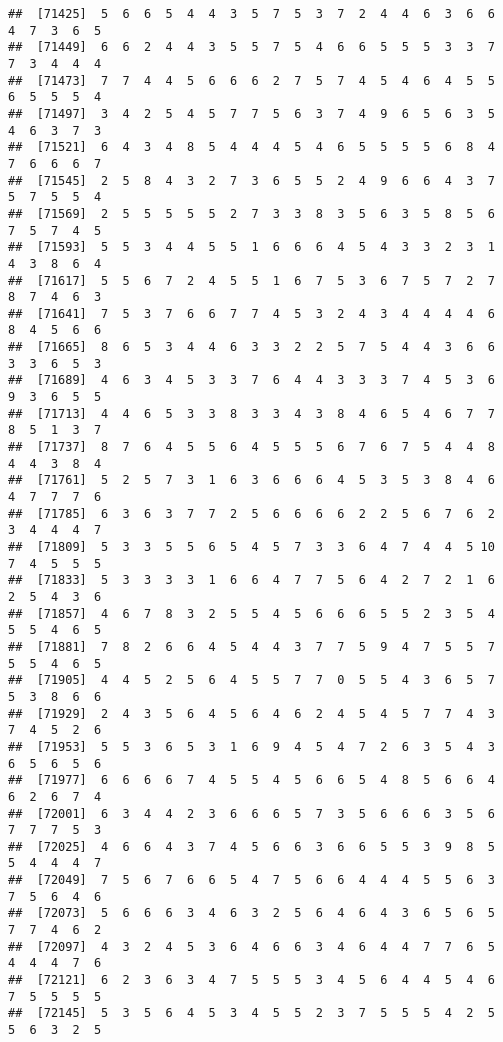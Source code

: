 \documentclass[
]{book}
\begin{document}
\begin{verbatim}
##  [71425]  5  6  6  5  4  4  3  5  7  5  3  7  2  4  4  6  3  6  6  4  7  3  6  5
##  [71449]  6  6  2  4  4  3  5  5  7  5  4  6  6  5  5  5  3  3  7  7  3  4  4  4
##  [71473]  7  7  4  4  5  6  6  6  2  7  5  7  4  5  4  6  4  5  5  6  5  5  5  4
##  [71497]  3  4  2  5  4  5  7  7  5  6  3  7  4  9  6  5  6  3  5  4  6  3  7  3
##  [71521]  6  4  3  4  8  5  4  4  4  5  4  6  5  5  5  5  6  8  4  7  6  6  6  7
##  [71545]  2  5  8  4  3  2  7  3  6  5  5  2  4  9  6  6  4  3  7  5  7  5  5  4
##  [71569]  2  5  5  5  5  5  2  7  3  3  8  3  5  6  3  5  8  5  6  7  5  7  4  5
##  [71593]  5  5  3  4  4  5  5  1  6  6  6  4  5  4  3  3  2  3  1  4  3  8  6  4
##  [71617]  5  5  6  7  2  4  5  5  1  6  7  5  3  6  7  5  7  2  7  8  7  4  6  3
##  [71641]  7  5  3  7  6  6  7  7  4  5  3  2  4  3  4  4  4  4  6  8  4  5  6  6
##  [71665]  8  6  5  3  4  4  6  3  3  2  2  5  7  5  4  4  3  6  6  3  3  6  5  3
##  [71689]  4  6  3  4  5  3  3  7  6  4  4  3  3  3  7  4  5  3  6  9  3  6  5  5
##  [71713]  4  4  6  5  3  3  8  3  3  4  3  8  4  6  5  4  6  7  7  8  5  1  3  7
##  [71737]  8  7  6  4  5  5  6  4  5  5  5  6  7  6  7  5  4  4  8  4  4  3  8  4
##  [71761]  5  2  5  7  3  1  6  3  6  6  6  4  5  3  5  3  8  4  6  4  7  7  7  6
##  [71785]  6  3  6  3  7  7  2  5  6  6  6  6  2  2  5  6  7  6  2  3  4  4  4  7
##  [71809]  5  3  3  5  5  6  5  4  5  7  3  3  6  4  7  4  4  5 10  7  4  5  5  5
##  [71833]  5  3  3  3  3  1  6  6  4  7  7  5  6  4  2  7  2  1  6  2  5  4  3  6
##  [71857]  4  6  7  8  3  2  5  5  4  5  6  6  6  5  5  2  3  5  4  5  5  4  6  5
##  [71881]  7  8  2  6  6  4  5  4  4  3  7  7  5  9  4  7  5  5  7  5  5  4  6  5
##  [71905]  4  4  5  2  5  6  4  5  5  7  7  0  5  5  4  3  6  5  7  5  3  8  6  6
##  [71929]  2  4  3  5  6  4  5  6  4  6  2  4  5  4  5  7  7  4  3  7  4  5  2  6
##  [71953]  5  5  3  6  5  3  1  6  9  4  5  4  7  2  6  3  5  4  3  6  5  6  5  6
##  [71977]  6  6  6  6  7  4  5  5  4  5  6  6  5  4  8  5  6  6  4  6  2  6  7  4
##  [72001]  6  3  4  4  2  3  6  6  6  5  7  3  5  6  6  6  3  5  6  7  7  7  5  3
##  [72025]  4  6  6  4  3  7  4  5  6  6  3  6  6  5  5  3  9  8  5  5  4  4  4  7
##  [72049]  7  5  6  7  6  6  5  4  7  5  6  6  4  4  4  5  5  6  3  7  5  6  4  6
##  [72073]  5  6  6  6  3  4  6  3  2  5  6  4  6  4  3  6  5  6  5  7  7  4  6  2
##  [72097]  4  3  2  4  5  3  6  4  6  6  3  4  6  4  4  7  7  6  5  4  4  4  7  6
##  [72121]  6  2  3  6  3  4  7  5  5  5  3  4  5  6  4  4  5  4  6  7  5  5  5  5
##  [72145]  5  3  5  6  4  5  3  4  5  5  2  3  7  5  5  5  4  2  5  5  6  3  2  5

\end{verbatim}
\end{document}
